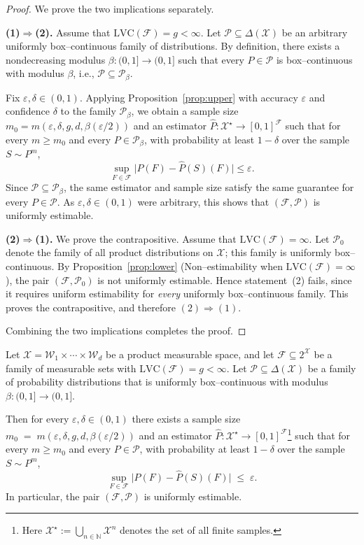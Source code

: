 \documentclass[arxiv]{colt2026}
\newcommand{\X}{\mathcal{X}}
\newcommand{\F}{\mathcal{F}}
\newcommand{\W}{\mathcal{W}}
\newcommand{\Pc}{\mathcal{P}}
\newcommand{\eps}{\varepsilon}
\newcommand{\LVC}{\mathrm{LVC}}
\begin{document}
\begin{proof}
We prove the two implications separately.

\medskip
\noindent\textbf{(1)$\Rightarrow$(2).}
Assume that $\LVC(\F)=g<\infty$.
Let $\Pc\subseteq\Delta(\X)$ be an arbitrary uniformly box--continuous family of
distributions.
By definition, there exists a nondecreasing modulus
$\beta:(0,1]\to(0,1]$ such that every $P\in\Pc$ is box--continuous with modulus
$\beta$, i.e., $\Pc\subseteq\Pc_\beta$.

Fix $\eps,\delta\in(0,1)$.
Applying Proposition~\ref{prop:upper} with accuracy $\eps$ and confidence
$\delta$ to the family
$\Pc_\beta$, we obtain a sample size
$m_0 = m(\eps,\delta,g,d,\beta(\eps/2))$
and an estimator $\widehat P:\X^\star\to[0,1]^{\F}$ such that for every
$m\ge m_0$ and every $P\in\Pc_\beta$, with probability at least $1-\delta$
over the sample $S\sim P^{m}$,
\[
\sup_{F\in\F}\bigl|P(F)-\widehat P(S)(F)\bigr|\le \eps.
\]
Since $\Pc\subseteq\Pc_\beta$, the same estimator and sample size satisfy the
same guarantee for every $P\in\Pc$.
As $\eps,\delta\in(0,1)$ were arbitrary, this shows that $(\F,\Pc)$ is uniformly
estimable.

\medskip
\noindent\textbf{(2)$\Rightarrow$(1).}
We prove the contrapositive.
Assume that $\LVC(\F)=\infty$.
Let $\Pc_0$ denote the family of all product distributions on $\X$; this family
is uniformly box--continuous.
By Proposition~\ref{prop:lower}
(Non--estimability when $\LVC(\F)=\infty$),
the pair $(\F,\Pc_0)$ is not uniformly estimable.
Hence statement~(2) fails, since it requires uniform estimability for
\emph{every} uniformly box--continuous family.
This proves the contrapositive, and therefore $(2)\Rightarrow(1)$.

\medskip
Combining the two implications completes the proof.
\end{proof}


\begin{proposition}
\label{prop:upper}
Let $\X=\W_1\times\cdots\times\W_d$ be a product measurable space, and let
$\F\subseteq 2^{\X}$ be a family of measurable sets with
$\LVC(\F)=g<\infty$.
Let $\Pc\subseteq\Delta(\X)$ be a family of probability distributions that is
uniformly box--continuous  with modulus
$\beta:(0,1]\to(0,1]$.

Then for every $\eps,\delta\in(0,1)$ there exists a sample size
$m_0 \;=\; m(\eps,\delta,g,d,\beta(\eps/2))$
and an estimator $\widehat P:\X^\star\to[0,1]^{\F}$\footnote{Here
$\X^\star:=\bigcup_{n\in\mathbb N}\X^n$ denotes the set of all finite samples.}
such that for every $m\ge m_0$ and every $P\in\Pc$, with probability at least
$1-\delta$ over the sample $S\sim P^{m}$,
\[
\sup_{F\in\F}\bigl|P(F)-\widehat P(S)(F)\bigr|\;\le\;\eps.
\]
In particular, the pair $(\F,\Pc)$ is uniformly estimable.
\end{proposition}
\end{document}
